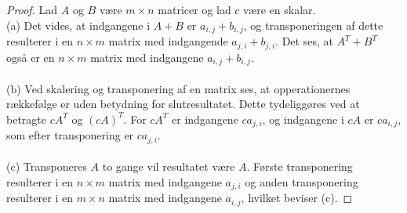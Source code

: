 %
\begin{proof}
Lad $A$ og $B$ være $m \times n$ matricer og lad $c$ være en skalar.\\
(a) Det vides, at indgangene i $A+B$ er $a_{i,j} + b_{i,j}$, og transponeringen af dette resulterer i en $n \times m$ matrix med indgangende $a_{j,i} + b_{j,i}$.
Det ses, at  $A^T + B^T$ også er en $n \times m$ matrix med indgangene $a_{i,j} + b_{i,j}$.\\\\
(b)
Ved skalering og transponering af en matrix ses, at opperationernes rækkefølge er uden betydning for slutresultatet.
Dette tydeliggøres ved at betragte $cA^T$ og $(cA)^T$.
For $cA^T$ er indgangene $ca_{j,i}$, og indgangene i $cA$ er $ca_{i,j}$, som efter transponering er $ca_{j,i}$.\\\\
(c)
Transponeres $A$ to gange vil resultatet være $A$.
Første transponering resulterer i en $n \times m$ matrix med indgangene $a_{j,i}$ og anden transponering resulterer i en $m \times n$ matrix med indgangene $a_{i,j}$, hvilket beviser (c).
\end{proof}